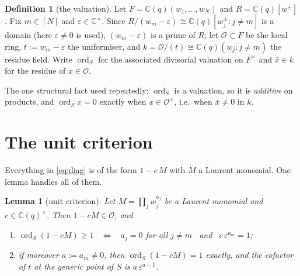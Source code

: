 \documentclass[11pt]{article}
\newtheorem{lem}[thm]{Lemma}
\theoremstyle{definition}
\newtheorem{defn}[thm]{Definition}
\theoremstyle{remark}
\DeclareMathOperator{\ord}{ord}
\begin{document}
\begin{defn}[the valuation]\label{def:ord}
Let $F=\mathbb{C}(q)(w_1,\dots,w_N)$ and $R=\mathbb{C}(q)[w^{\pm}]$.  Fix $m\in[N]$ and
$\varepsilon\in\mathbb{C}^{\times}$.  Since $R/(w_m-\varepsilon)\cong
\mathbb{C}(q)[w_j^{\pm}:j\ne m]$ is a domain (here $\varepsilon\ne0$ is used),
$(w_m-\varepsilon)$ is a prime of $R$; let $\mathcal{O}\subset F$ be the local ring,
$t:=w_m-\varepsilon$ the uniformiser, and
$k=\mathcal{O}/(t)\cong\mathbb{C}(q)(w_j:j\ne m)$ the residue field.  Write $\ord_S$ for
the associated divisorial valuation on $F^{\times}$ and $\bar x\in k$ for the residue of
$x\in\mathcal{O}$.
\end{defn}

The one structural fact used repeatedly: $\ord_S$ is a valuation, so it is
\emph{additive} on products, and $\ord_S x=0$ exactly when $x\in\mathcal{O}^{\times}$,
i.e.\ when $\bar x\ne0$ in $k$.

\section{The unit criterion}

Everything in \eqref{eq:diag} is of the form $1-c\,M$ with $M$ a Laurent monomial.  One
lemma handles all of them.

\begin{lem}[unit criterion]\label{lem:unit}
Let $M=\prod_{j}w_j^{a_j}$ be a Laurent monomial and $c\in\mathbb{C}(q)^{\times}$.  Then
$1-cM\in\mathcal{O}$, and
\begin{enumerate}[label=\textup{(\roman*)},leftmargin=2.2em]
\item $\ord_S(1-cM)\ge1$ \ $\iff$ \ $a_j=0$ for all $j\ne m$ \ and \
  $c\,\varepsilon^{a_m}=1$;
\item if moreover $a:=a_m\ne0$, then $\ord_S(1-cM)=1$ \emph{exactly}, and the cofactor
  of $t$ at the generic point of $S$ is $a\,\varepsilon^{a-1}$.
\end{enumerate}
\end{lem}
\end{document}
